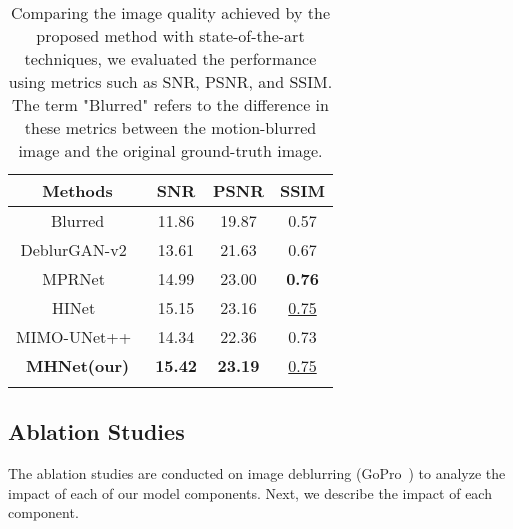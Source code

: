 \documentclass[lettersize,journal]{IEEEtran}
\begin{document}
\begin{table}[htb]
\begin{center}
\caption{Comparing the image quality achieved by the proposed method with state-of-the-art techniques, we evaluated the performance using metrics such as SNR, PSNR, and SSIM. The term "Blurred" refers to the difference in these metrics between the motion-blurred image and the original ground-truth image.}
\begin{tabular}{cccc}
\\ \hline
Methods                                  & SNR            & PSNR           & SSIM                            \\ \hline
Blurred                                  & 11.86          & 19.87          & 0.57                            \\
DeblurGAN-v2~\cite{deganv2}                             & 13.61          & 21.63          & 0.67                            \\
MPRNet~\cite{Zamir2021MPRNet}                                   & 14.99          & 23.00          & \textbf{0.76}                   \\
HINet~\cite{Chen_2021_CVPR}                                    & 15.15          & 23.16          & \underline{0.75}                      \\
MIMO-UNet++~\cite{2021Rethinking}                              & 14.34          & 22.36          & 0.73                            \\ \hline
\textbf{MHNet(our)} & \textbf{15.42} & \textbf{23.19} & \underline{0.75} \\ \hline
\label{tb:00200}
\end{tabular}
\end{center}

\end{table}




\subsection{Ablation Studies}
The ablation studies are conducted on image deblurring (GoPro~\cite{Gopro}) to analyze the impact of each of our model components. Next, we describe the impact of each component.
\end{document}
